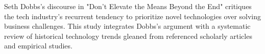 \documentclass[a4Paper]{article}
\begin{document}




Seth Dobbs's discourse in "Don't Elevate the Means Beyond the End" critiques the tech industry's recurrent tendency to prioritize novel technologies over solving business challenges. This study integrates Dobbs's argument with a systematic review of historical technology trends gleaned from referenced scholarly articles and empirical studies.
\end{document}
